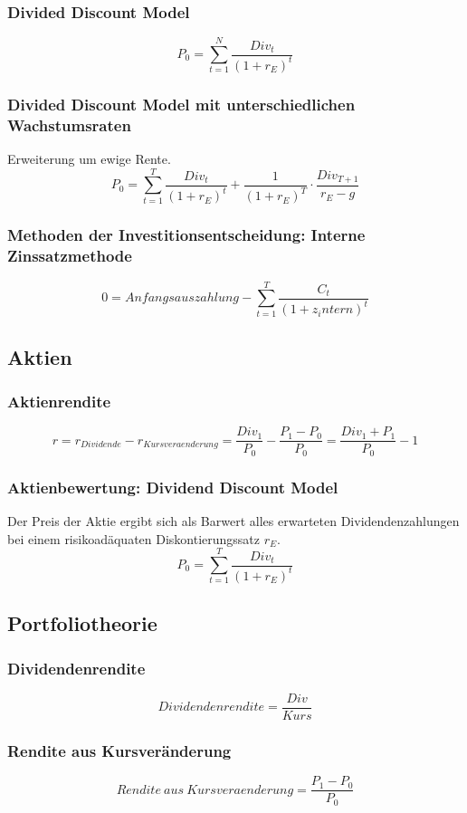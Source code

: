 \subsubsection{Divided Discount Model}
\[P_0 = \sum_{t=1}^{N} \frac{Div_t}{(1+r_E)^t}\]

\subsubsection{Divided Discount Model mit unterschiedlichen Wachstumsraten}
Erweiterung um ewige Rente.
\[P_0 = \sum_{t=1}^{T} \frac{Div_t}{(1+r_E)^t} + \frac{1}{(1+r_E)^T}\cdot\frac{Div_{T+1}}{r_E-g}\]

\subsubsection{Methoden der Investitionsentscheidung: Interne Zinssatzmethode}
\[0 = Anfangsauszahlung - \sum_{t=1}^{T}\frac{C_t}{(1+z_intern)^t}\]


\subsection{Aktien}

\subsubsection{Aktienrendite}
\[r = r_{Dividende}-r_{Kursveraenderung} = \frac{Div_1}{P_0}-\frac{P_1-P_0}{P_0} = \frac{Div_1+P_1}{P_0} - 1\]

\subsubsection{Aktienbewertung: Dividend Discount Model}
Der Preis der Aktie ergibt sich als Barwert alles erwarteten Dividendenzahlungen bei einem risikoadäquaten Diskontierungssatz \(r_E\).
\[P_0 = \sum_{t=1}^T \frac{Div_t}{(1+r_E)^t}\]


\subsection{Portfoliotheorie}

\subsubsection{Dividendenrendite}
\[Dividendenrendite = \frac{Div}{Kurs}\]

\subsubsection{Rendite aus Kursveränderung}
\[Rendite~aus~Kursveraenderung = \frac{P_1-P_0}{P_0}\]

